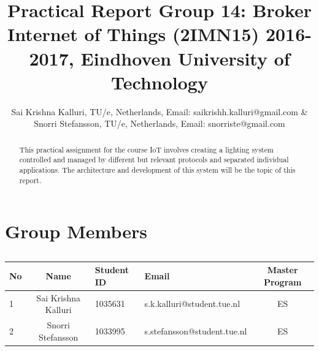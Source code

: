\documentclass[11pt]{article}
\begin{document}
\title{Practical Report Group 14: Broker\\ {\fontsize{13}{0}\selectfont Internet of Things (2IMN15) 2016-2017, Eindhoven University of Technology}}

\author{Sai Krishna Kalluri, TU/e, Netherlands, 
		Email: saikrishh.kalluri@gmail.com \& \\  Snorri Stefansson, TU/e, Netherlands, Email: snorriste@gmail.com}
\maketitle

\begin{abstract}
	This practical assignment for the course IoT involves creating a lighting system controlled and managed by different but relevant protocols and separated individual applications. The architecture and development of this system will be the topic of this report.\\	
\end{abstract}
\pagebreak
\tableofcontents

\pagebreak

\section{Group Members}
\begin{table}[htbp]
	\caption{}
	\begin{tabular}{lcllc}
		\toprule
		No & Name & Student ID & Email & Master Program \\ 
		\midrule
		1 & Sai Krishna Kalluri & 1035631 & s.k.kalluri@student.tue.nl & ES \\ 
		2 & Snorri Stefansson & 1033995 & s.stefansson@student.tue.nl & ES \\ 
		\toprule
	\end{tabular}
	\label{}
\end{table}
\end{document}
